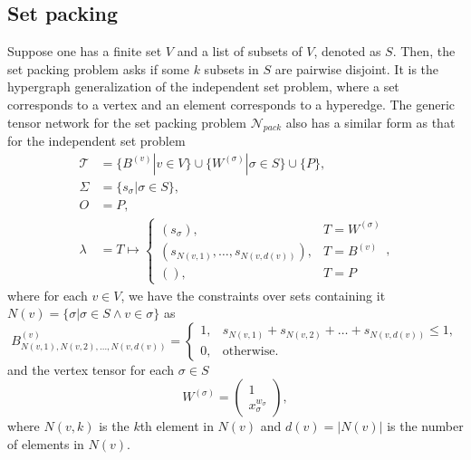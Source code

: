 \documentclass[review, onefignum, onetabnum]{siamart190516}
\begin{document}
\subsection{Set packing}
Suppose one has a finite set $V$ and a list of subsets of $V$, denoted as $S$. Then, the set packing problem asks if some $k$ subsets in $S$ are pairwise disjoint.
It is the hypergraph generalization of the independent set problem, where a set corresponds to a vertex and an element corresponds to a hyperedge.
The generic tensor network for the set packing problem $\mathcal{N}_{pack}$ also has a similar form as that for the independent set problem
\begin{equation}\label{eq:packtensornetwork}
\begin{split}
    \mathcal{T} &= \{B^{(v)} | v\in V\} \cup \{W^{(\sigma)} | \sigma \in S\} \cup \{P\},\\
    \Sigma &= \{s_\sigma | \sigma \in S\},\\
    O &= P,\\
    \lambda &= T \mapsto \begin{cases}
                    (s_\sigma), & T = W^{(\sigma)}\\
                    (s_{N(v, 1)}, \ldots, s_{N(v, d(v))}), & T = B^{(v)}\\
                    (), & T = P
                    \end{cases},
\end{split}
\end{equation}
where for each $v \in V$, we have the constraints over sets containing it $N(v) = \{\sigma| \sigma\in S \wedge v \in \sigma\}$ as
\begin{equation}
    B^{(v)}_{N(v, 1), N(v, 2),\ldots, N(v, d(v))} = \begin{cases}
        1, & s_{N(v, 1)}+ s_{N(v, 2)} + \ldots + s_{N(v, d(v))}\leq 1,\\
        0, & \text{otherwise}.
    \end{cases}
\end{equation}
and the vertex tensor for each $\sigma \in S$
\begin{equation}
    W^{(\sigma)} = \left(\begin{matrix}
        1\\
        x^{w_\sigma}_{\sigma}
    \end{matrix}\right),
\end{equation}
where $N(v, k)$ is the $k$th element in $N(v)$ and $d(v) = |N(v)|$ is the number of elements in $N(v)$.
\end{document}
